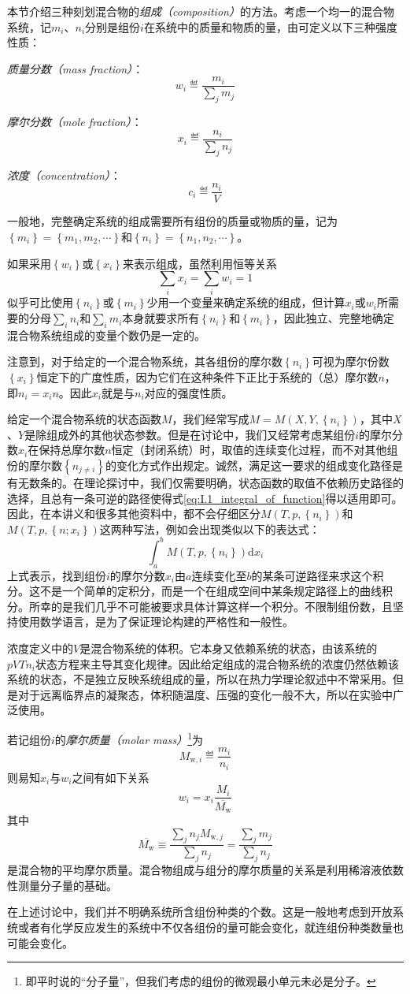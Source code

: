 \documentclass[main.tex]{subfiles}
\begin{document}
本节介绍三种刻划混合物的\emph{组成（composition）}的方法。考虑一个均一的混合物系统，记$m_i$、$n_i$分别是组份$i$在系统中的质量和物质的量，由可定义以下三种强度性质：

\emph{质量分数（mass fraction）}：
\[w_i\eqdef\frac{m_i}{\sum_jm_j}\]

\emph{摩尔分数（mole fraction）}：
\[x_i\eqdef\frac{n_i}{\sum_jn_j}\]

\emph{浓度（concentration）}：
\[c_i\eqdef\frac{n_i}{V}\]

一般地，完整确定系统的组成需要所有组份的质量或物质的量，记为$\left\{m_i\right\}=\left\{m_1,m_2,\cdots\right\}$和$\left\{n_i\right\}=\left\{n_1,n_2,\cdots\right\}$。

如果采用$\left\{w_i\right\}$或$\left\{x_i\right\}$来表示组成，虽然利用恒等关系
\[\sum_ix_i=\sum_iw_i=1\]
似乎可比使用$\left\{n_i\right\}$或$\left\{m_i\right\}$少用一个变量来确定系统的组成，但计算$x_i$或$w_i$所需要的分母$\sum_in_i$和$\sum_im_i$本身就要求所有$\left\{n_i\right\}$和$\left\{m_i\right\}$，因此独立、完整地确定混合物系统组成的变量个数仍是一定的。

注意到，对于给定的一个混合物系统，其各组份的摩尔数$\left\{n_i\right\}$可视为摩尔份数$\left\{x_i\right\}$恒定下的广度性质，因为它们在这种条件下正比于系统的（总）摩尔数$n$，即$n_i=x_in$。因此$x_i$就是与$n_i$对应的强度性质。

给定一个混合物系统的状态函数$M$，我们经常写成$M=M\left(X,Y,\left\{n_i\right\}\right)$，其中$X$、$Y$是除组成外的其他状态参数。但是在讨论中，我们又经常考虑某组份$i$的摩尔分数$x_i$在保持总摩尔数$n$恒定（封闭系统）时，取值的连续变化过程，而不对其他组份的摩尔数$\left\{n_{j\neq i}\right\}$的变化方式作出规定。诚然，满足这一要求的组成变化路径是有无数条的。在理论探讨中，我们仅需要明确，状态函数的取值不依赖历史路径的选择，且总有一条可逆的路径使得式\eqref{eq:I.1_integral_of_function}得以适用即可。因此，在本讲义和很多其他资料中，都不会仔细区分$M\left(T,p,\left\{n_i\right\}\right)$和$M\left(T,p,\left\{n;x_i\right\}\right)$这两种写法，例如会出现类似以下的表达式：
\[\int_a^bM\left(T,p,\left\{n_i\right\}\right)\mathrm{d}x_i\]
上式表示，找到组份$i$的摩尔分数$x_i$由$a$连续变化至$b$的某条可逆路径来求这个积分。这不是一个简单的定积分，而是一个在组成空间中某条规定路径上的曲线积分。所幸的是我们几乎不可能被要求具体计算这样一个积分。不限制组份数，且坚持使用数学语言，是为了保证理论构建的严格性和一般性。

浓度定义中的$V$是混合物系统的体积。它本身又依赖系统的状态，由该系统的$pVTn_i$状态方程来主导其变化规律。因此给定组成的混合物系统的浓度仍然依赖该系统的状态，不是独立反映系统组成的量，所以在热力学理论叙述中不常采用。但是对于远离临界点的凝聚态，体积随温度、压强的变化一般不大，所以在实验中广泛使用。

若记组份$i$的\emph{摩尔质量（molar mass）}\footnote{即平时说的“分子量”，但我们考虑的组份的微观最小单元未必是分子。}为
\[M_{\text{w},i}\eqdef\frac{m_i}{n_i}\]
则易知$x_i$与$w_i$之间有如下关系
\[w_i=x_i\frac{M_i}{\overline{M_\text{w}}}\]
其中
\[\overline{M_\text{w}}\equiv\frac{\sum_jn_jM_{\text{w},j}}{\sum_jn_j}=\frac{\sum_jm_j}{\sum_jn_j}\]
是混合物的平均摩尔质量。混合物组成与组分的摩尔质量的关系是利用稀溶液依数性测量分子量的基础。

在上述讨论中，我们并不明确系统所含组份种类的个数。这是一般地考虑到开放系统或者有化学反应发生的系统中不仅各组份的量可能会变化，就连组份种类数量也可能会变化。
\end{document}

